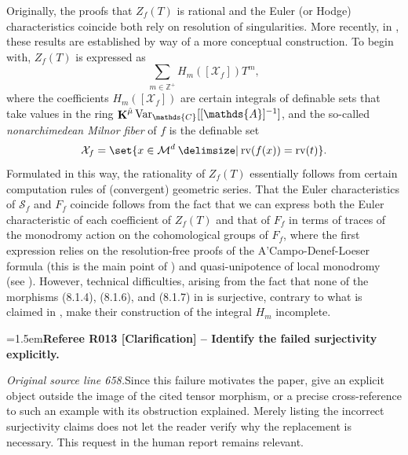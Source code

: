 \documentclass[12pt]{amsart}
\newcommand{\RefereeRemark}[4]{%
  \par\medskip\begingroup\normalfont\small\color{RefereePurple}%
  \emergencystretch=1.5em\noindent\textbf{Referee R#1 [#2] -- #3.}\par\nobreak\noindent #4\par
  \endgroup\medskip
}
\newcommand{\memph}[1]{{\color{magenta}\emph{#1}}}
\theoremstyle{plain}
\theoremstyle{definition}
\theoremstyle{remark}
\numberwithin{equation}{section}
\theoremstyle{plain}
\newcommand{\MM}{\mdl M}
\newcommand{\Z}{\mathds{Z}}
\newcommand{\A}{\mathds{A}}
\newcommand{\C}{\mathds{C}}
\newcommand{\0}{\emptyset}
\newcommand{\mdl}[1]{\mathcal{#1}}  %
\providecommand\given{}
\newcommand\SetSymbol[1][]{%
\nonscript \: #1 \vert
\allowbreak
\nonscript\:
\mathopen{}}
\renewcommand\given{\SetSymbol[\delimsize]}
\DeclareMathOperator{\rv}{rv}
\DeclareMathOperator{\ggk}{\mathbf{K}}
\newcommand{\var}{\textup{Var}}
\newcommand{\gmv}{\ggk^{\hat \mu}\var_{\C}}
\begin{document}
Originally,  the proofs that $Z_f(T)$ is rational and  the Euler (or Hodge) characteristics coincide both rely on resolution of singularities.  More recently, in \cite{hru:loe:lef}, these results are established by way of a more conceptual construction. To begin with, $Z_{f}(T)$ is expressed as
\begin{equation*}\label{intro:zeta:mot}
\sum_{m \in \Z^+} H_m([\mdl X_f]) T^m,
\end{equation*}
where the coefficients $H_m([\mdl X_f])$ are certain integrals of definable sets that take values in the ring $\gmv [[\A]^{-1}]$,  and the so-called \memph{nonarchimedean Milnor fiber} of $f$ is the definable set
\[
\mdl X_f = \set{x \in \MM^d \given \rv(f(x)) = \rv(t) }.
\]
Formulated in this way, the rationality of $Z_{f}(T)$ essentially follows from  certain computation rules of (convergent) geometric series. That the Euler characteristics of $\mathscr S_{f}$ and $F_{f}$ coincide follows from the fact that we can express both the Euler characteristic of each coefficient of $Z_{f}(T)$ and that of $F_{f}$ in terms of traces of the monodromy action on the cohomological groups of $F_{f}$, where the first expression relies on  the resolution-free proofs of the A'Campo-Denef-Loeser formula (this is the main point of \cite{hru:loe:lef}) and quasi-unipotence of local monodromy (see \cite[Remark~8.5.5]{hru:loe:lef}). However, technical difficulties, arising from the fact that none of the morphisms (8.1.4), (8.1.6), and (8.1.7) in \cite{hru:loe:lef} is surjective, contrary to what is claimed in \cite[Proposition~10.10(2)]{hrushovski:kazhdan:integration:vf}, make their construction of the integral $H_m$ incomplete.

\RefereeRemark{013}{Clarification}{Identify the failed surjectivity explicitly}{%
\textit{Original source line 658.}\quad Since this failure motivates the paper, give an explicit object outside the image of the cited tensor morphism, or a precise cross-reference to such an example with its obstruction explained. Merely listing the incorrect surjectivity claims does not let the reader verify why the replacement is necessary. This request in the human report remains relevant.
}
\end{document}

